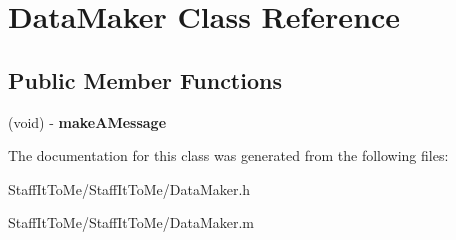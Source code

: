 \hypertarget{interface_data_maker}{
\section{\-Data\-Maker \-Class \-Reference}
\label{interface_data_maker}
}
\subsection*{\-Public \-Member \-Functions}
\begin{DoxyCompactItemize}
\item 
\hypertarget{interface_data_maker_ab0227ade3d4c6f4707fc245878d039e6}{
(void) -\/ {\bfseries make\-A\-Message}}
\label{interface_data_maker_ab0227ade3d4c6f4707fc245878d039e6}

\end{DoxyCompactItemize}


\-The documentation for this class was generated from the following files\-:\begin{DoxyCompactItemize}
\item 
\-Staff\-It\-To\-Me/\-Staff\-It\-To\-Me/\-Data\-Maker.\-h\item 
\-Staff\-It\-To\-Me/\-Staff\-It\-To\-Me/\-Data\-Maker.\-m\end{DoxyCompactItemize}

